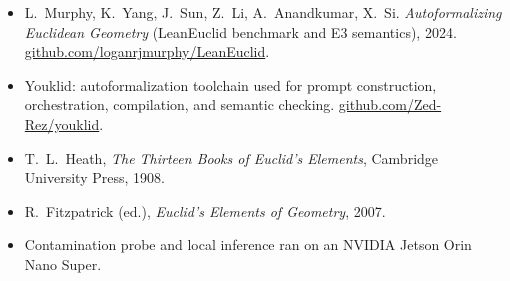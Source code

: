 \documentclass[11pt]{article}
\begin{document}
\begin{itemize}
\setlength{\itemsep}{0.2em}
\item L.~Murphy, K.~Yang, J.~Sun, Z.~Li, A.~Anandkumar, X.~Si.
\emph{Autoformalizing Euclidean Geometry} (LeanEuclid benchmark and E3
semantics), 2024.
\href{https://github.com/loganrjmurphy/LeanEuclid}{github.com/loganrjmurphy/LeanEuclid}.
\item Youklid: autoformalization toolchain used for prompt construction,
orchestration, compilation, and semantic checking.
\href{https://github.com/Zed-Rez/youklid}{github.com/Zed-Rez/youklid}.
\item T.~L.~Heath, \emph{The Thirteen Books of Euclid's Elements}, Cambridge
University Press, 1908.
\item R.~Fitzpatrick (ed.), \emph{Euclid's Elements of Geometry}, 2007.
\item Contamination probe and local inference ran on an NVIDIA Jetson Orin Nano
Super.
\end{itemize}
\end{document}
